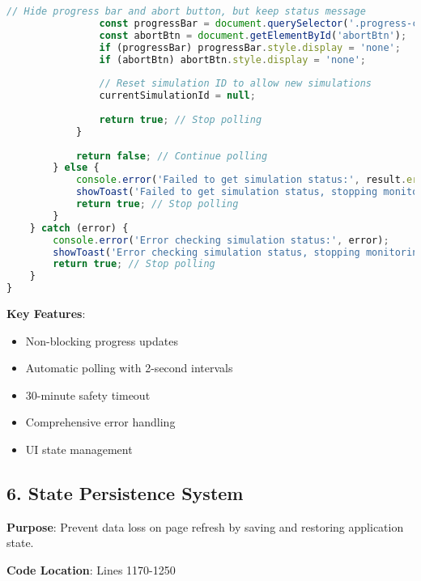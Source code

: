 \documentclass[12pt,a4paper]{article}
\begin{document}
\begin{lstlisting}[language=JavaScript, caption=Progress Monitoring System]
                // Hide progress bar and abort button, but keep status message
                const progressBar = document.querySelector('.progress-container');
                const abortBtn = document.getElementById('abortBtn');
                if (progressBar) progressBar.style.display = 'none';
                if (abortBtn) abortBtn.style.display = 'none';
                
                // Reset simulation ID to allow new simulations
                currentSimulationId = null;
                
                return true; // Stop polling
            }
            
            return false; // Continue polling
        } else {
            console.error('Failed to get simulation status:', result.error);
            showToast('Failed to get simulation status, stopping monitoring', 'error');
            return true; // Stop polling
        }
    } catch (error) {
        console.error('Error checking simulation status:', error);
        showToast('Error checking simulation status, stopping monitoring', 'error');
        return true; // Stop polling
    }
}
\end{lstlisting}

\textbf{Key Features}:
\begin{itemize}
    \item Non-blocking progress updates
    \item Automatic polling with 2-second intervals
    \item 30-minute safety timeout
    \item Comprehensive error handling
    \item UI state management
\end{itemize}

\subsection{6. State Persistence System}

\textbf{Purpose}: Prevent data loss on page refresh by saving and restoring application state.

\textbf{Code Location}: Lines 1170-1250
\end{document}
